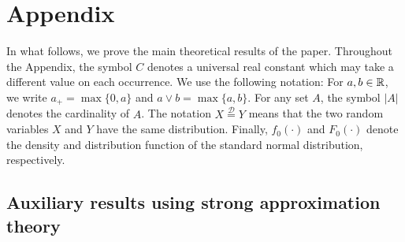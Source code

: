 
\section*{Appendix}

\def\theequation{A.\arabic{equation}}
\setcounter{equation}{0}
\allowdisplaybreaks[3]



In what follows, we prove the main theoretical results of the paper. Throughout the Appendix, the symbol $C$ denotes a universal real constant which may take a different value on each occurrence. We use the following notation: For $a,b \in \mathbb{R}$, we write $a_+ = \max \{0,a\}$ and $a \vee b = \max\{a,b\}$. For any set $A$, the symbol $|A|$ denotes the cardinality of $A$. The notation $X \stackrel{\mathcal{D}}{=} Y$ means that the two random variables $X$ and $Y$ have the same distribution. Finally, $f_0(\cdot)$ and $F_0(\cdot)$ denote the density and distribution function of the standard normal distribution, respectively.



\subsection*{Auxiliary results using strong approximation theory}


